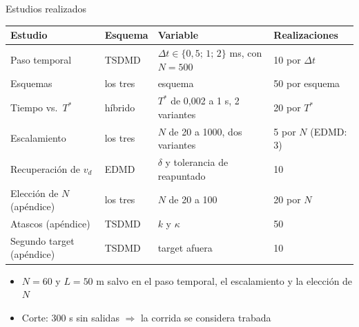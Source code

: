 \documentclass[aspectratio=169,11pt]{beamer}
\newcommand{\dt}{\Delta t}
\newcommand{\tstar}{T^{*}}
\newenvironment{puntos}{\begin{itemize}\setlength\itemsep{0pt}\setlength\topsep{1pt}\setlength\leftmargini{12pt}}{\end{itemize}}
\begin{document}
\begin{frame}{Estudios realizados}
\centering\small
\renewcommand{\arraystretch}{1.3}
\setlength{\tabcolsep}{4pt}
\begin{tabular}{@{}llll@{}}
\toprule
\textcolor{itbablue}{\textbf{Estudio}} & Esquema & Variable & \textcolor{itbablue}{\textbf{Realizaciones}}\\
\midrule
Paso temporal & TSDMD & $\dt\in\{0{,}5;\,1;\,2\}$ ms, con $N=500$ & 10 por $\dt$\\
Esquemas & los tres & esquema & 50 por esquema\\
Tiempo vs.\ $\tstar$ & híbrido & $\tstar$ de 0,002 a 1 s, 2 variantes & 20 por $\tstar$\\
Escalamiento & los tres & $N$ de 20 a 1000, dos variantes & 5 por $N$ (EDMD: 3)\\
Recuperación de $v_d$ & EDMD & $\delta$ y tolerancia de reapuntado & 10\\
Elección de $N$ (apéndice) & los tres & $N$ de 20 a 100 & 20 por $N$\\
Atascos (apéndice) & TSDMD & $k$ y $\kappa$ & 50\\
Segundo target (apéndice) & TSDMD & target afuera & 10\\
\bottomrule
\end{tabular}
\par\medskip
\begin{puntos}
\item $N=60$ y $L=50$ m salvo en el paso temporal, el escalamiento y la elección de $N$
\item Corte: 300 s sin salidas $\Rightarrow$ la corrida se considera trabada
\end{puntos}
\end{frame}
\end{document}
